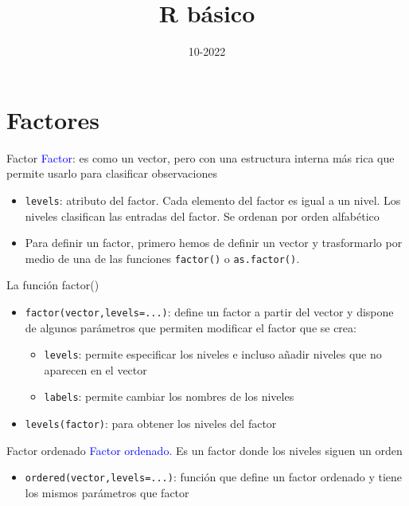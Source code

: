 \documentclass[
  ignorenonframetext,
  aspectratio=169]{beamer}
\title{R básico}
\author{}
\date{\vspace{-2.5em}10-2022}
\providecommand{\tightlist}{%
  \setlength{\itemsep}{0pt}\setlength{\parskip}{0pt}}
\newcommand\blue[1]{\textcolor{blue}{#1}}
\begin{document}
\frame{\titlepage}

\begin{frame}[allowframebreaks]
  \tableofcontents[hideallsubsections]
\end{frame}
\hypertarget{factores}{%
\section{Factores}\label{factores}}

\begin{frame}[fragile]{Factor}
\protect\hypertarget{factor}{}
\blue{Factor}: es como un vector, pero con una estructura interna más
rica que permite usarlo para clasificar observaciones

\begin{itemize}
\tightlist
\item
  \texttt{levels}: atributo del factor. Cada elemento del factor es
  igual a un nivel. Los niveles clasifican las entradas del factor. Se
  ordenan por orden alfabético
\item
  Para definir un factor, primero hemos de definir un vector y
  trasformarlo por medio de una de las funciones \texttt{factor()} o
  \texttt{as.factor()}.
\end{itemize}
\end{frame}

\begin{frame}[fragile]{La función factor()}
\protect\hypertarget{la-funciuxf3n-factor}{}
\begin{itemize}
\item
  \texttt{factor(vector,levels=...)}: define un factor a partir del
  vector y dispone de algunos parámetros que permiten modificar el
  factor que se crea:

  \begin{itemize}
  \tightlist
  \item
    \texttt{levels}: permite especificar los niveles e incluso añadir
    niveles que no aparecen en el vector
  \item
    \texttt{labels}: permite cambiar los nombres de los niveles
  \end{itemize}
\item
  \texttt{levels(factor)}: para obtener los niveles del factor
\end{itemize}
\end{frame}

\begin{frame}[fragile]{Factor ordenado}
\protect\hypertarget{factor-ordenado}{}
\blue{Factor ordenado.} Es un factor donde los niveles siguen un orden

\begin{itemize}
\tightlist
\item
  \texttt{ordered(vector,levels=...)}: función que define un factor
  ordenado y tiene los mismos parámetros que factor
\end{itemize}
\end{frame}
\end{document}
